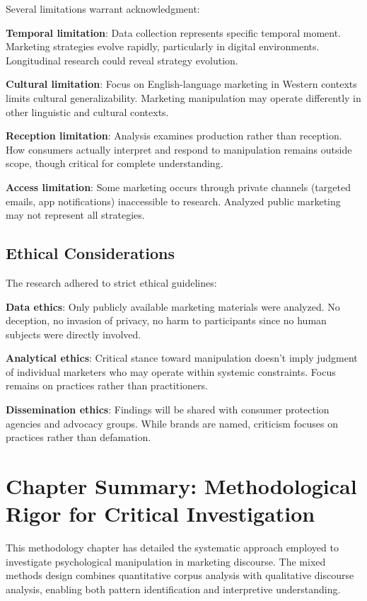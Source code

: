 Several limitations warrant acknowledgment:

\textbf{Temporal limitation}: Data collection represents specific temporal moment. Marketing strategies evolve rapidly, particularly in digital environments. Longitudinal research could reveal strategy evolution.

\textbf{Cultural limitation}: Focus on English-language marketing in Western contexts limits cultural generalizability. Marketing manipulation may operate differently in other linguistic and cultural contexts.

\textbf{Reception limitation}: Analysis examines production rather than reception. How consumers actually interpret and respond to manipulation remains outside scope, though critical for complete understanding.

\textbf{Access limitation}: Some marketing occurs through private channels (targeted emails, app notifications) inaccessible to research. Analyzed public marketing may not represent all strategies.

\subsection{Ethical Considerations}

The research adhered to strict ethical guidelines:

\textbf{Data ethics}: Only publicly available marketing materials were analyzed. No deception, no invasion of privacy, no harm to participants since no human subjects were directly involved.

\textbf{Analytical ethics}: Critical stance toward manipulation doesn't imply judgment of individual marketers who may operate within systemic constraints. Focus remains on practices rather than practitioners.

\textbf{Dissemination ethics}: Findings will be shared with consumer protection agencies and advocacy groups. While brands are named, criticism focuses on practices rather than defamation.

\section{Chapter Summary: Methodological Rigor for Critical Investigation}
\label{sec:method_summary}

This methodology chapter has detailed the systematic approach employed to investigate psychological manipulation in marketing discourse. The mixed methods design combines quantitative corpus analysis with qualitative discourse analysis, enabling both pattern identification and interpretive understanding.

